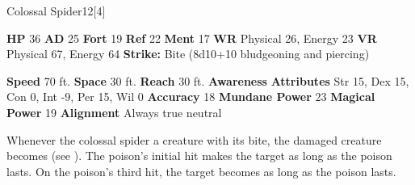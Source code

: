   \begin{monsubsection}{Colossal Spider}{12}[4]
    \vspace{-1em}\vspace{-1em}
    \vspace{0em}

    
    

    \begin{spellcontent}
      \begin{spelltargetinginfo}
        \pari \textbf{HP} 36 \monsep
          \textbf{AD} 25 \monsep
          \textbf{Fort} 19 \monsep
          \textbf{Ref} 22 \monsep
          \textbf{Ment} 17
        \pari \textbf{WR} Physical 26, Energy 23 \monsep
        \textbf{VR} Physical 67, Energy 64
        \pari \textbf{Strike:}
            Bite  (8d10+10 bludgeoning and piercing)
      \end{spelltargetinginfo}
    \end{spellcontent}
    \begin{monsterfooter}
      \pari \textbf{Speed} 70 ft. \monsep
        \textbf{Space} 30 ft. \monsep
        \textbf{Reach} 30 ft.
      \pari \textbf{Awareness} 
      \pari \textbf{Attributes}
        Str 15, Dex 15,
        Con 0, Int -9,
        Per 15, Wil 0
      \pari \textbf{Accuracy} 18 \monsep
        \textbf{Mundane Power} 23 \monsep
      \textbf{Magical Power} 19
      \pari \textbf{Alignment} Always true neutral
    \end{monsterfooter}
  \end{monsubsection}
        Whenever the colossal spider  a creature with its bite,
          the damaged creature becomes  (see ).
        The poison's initial hit makes the target  as long as the poison lasts.
        On the poison's third hit, the target becomes  as long as the poison lasts.
  
